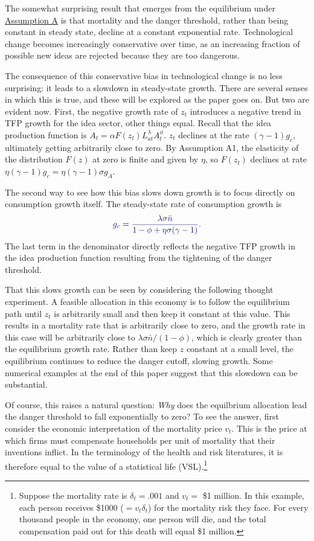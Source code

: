 \documentclass[12pt,twoside]{article}
\newcommand{\clr}[1]{{\color{ChadBlue} #1}}
\begin{document}
The somewhat surprising result that emerges from the equilibrium under
\hyperlink{ASSUME}{Assumption A} is that mortality and the danger
threshold, rather than being constant in steady state, decline at a
constant exponential rate.  Technological change becomes increasingly
conservative over time, as an increasing fraction of possible new ideas
are rejected because they are too dangerous.

The consequence of this conservative bias in technological change is no
less surprising: it leads to a slowdown in steady-state growth. There
are several senses in which this is true, and these will be explored as
the paper goes on. But two are evident now. First, the negative growth
rate of $z_t$ introduces a negative trend in TFP growth for the idea
sector, other things equal. Recall that the idea production function is
$\dot{A}_t = \alpha F(z_t) L_{at} ^\lambda A_t ^\phi$. $z_t$ declines at
the rate $(\gamma-1)g_c$, ultimately getting arbitrarily close to zero.
By Assumption A1, the elasticity of the distribution $F(z)$ at zero is
finite and given by $\eta$, so $F(z_t)$ declines at rate $\eta
(\gamma-1) g_c = \eta (\gamma-1) \sigma g_A$. 

The second way to see how this bias slows down growth is to focus
directly on consumption growth itself.  The steady-state rate of
consumption growth is 
\begin{equation}
\label{eq:gc}
\clr{ g_c=\frac{\lambda \sigma \bar{n}}{1-\phi+\eta \sigma (\gamma-1)}. }
\end{equation}
The last term in the denominator directly reflects the negative TFP
growth in the idea production function resulting from the tightening of
the danger threshold.  

That this slows growth can be seen by considering the following thought
experiment.  A feasible allocation in this economy is to follow the
equilibrium path until $z_t$ is arbitrarily small and then keep it
constant at this value.  This results in a mortality rate that is
arbitrarily close to zero, and the growth rate in this case will be
arbitrarily close to $\lambda \sigma \bar{n} / (1-\phi)$, which is
clearly greater than the equilibrium growth rate.  Rather than keep $z$
constant at a small level, the equilibrium continues to reduce the
danger cutoff, slowing growth.  Some numerical examples at the end of
this paper suggest that this slowdown can be substantial.

Of course, this raises a natural question: {\it Why} does the equilbrium
allocation lead the danger threshold to fall exponentially to zero? To
see the answer, first consider the economic interpretation of the
mortality price $v_t$. This is the price at which firms must compensate
households per unit of mortality that their inventions inflict. In the
terminology of the health and risk literatures, it is therefore equal to
the value of a statistical life (VSL).\footnote{Suppose the mortality
  rate is $\delta_t=.001$ and $v_t=$ \$1 million. In this example, each
  person receives \$1000 ($=v_t \delta_t$) for the mortality risk they
  face. For every thousand people in the economy, one person will die,
  and the total compensation paid out for this death will equal \$1
  million.}
\end{document}
